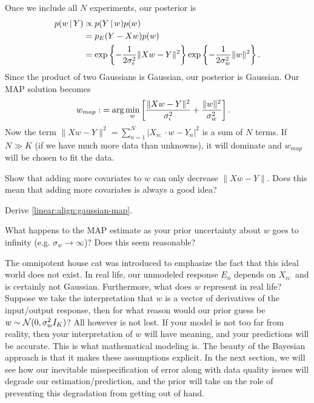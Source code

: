 Once we include all $N$ experiments, our posterior is
\begin{align*}
  p(w{\,|\,} Y) &\propto p(Y{\,|\,} w)p(w) \\
  & = p_E(Y-Xw)p(w) \\ 
  & = \exp\left\{ -\frac{1}{2\sigma_{\epsilon}^2}\|Xw-Y\|^2 \right\}\exp\left\{-\frac{1}{2\sigma_w^2}\|w\|^2\right\}.
\end{align*}
Since the product of two Gaussians is Gaussian, our posterior is Gaussian.  Our MAP solution becomes
\begin{align}
  w_{map} :&= \arg\min_w \left[  \frac{\|Xw-Y\|^2}{\sigma_{\epsilon}^2} + \frac{\|w\|^2}{\sigma_w^2}\right].
  \label{linear:align:gaussian-map}
\end{align}
Now the term $\|Xw-Y\|^2 = \sum_{n=1}^N|X_{n:}\cdot w - Y_n|^2$ is a sum of $N$ terms.  If $N\gg K$ (if we have much more data than unknowns), it will dominate and $w_{map}$ will be chosen to fit the data.

\begin{exercise}
  \label{linear:exercise:overfitting-simple}
  Show that adding more covariates to $w$ can only decrease $\|X w-Y\|$.  Does this mean that adding more covariates is always a good idea?
\end{exercise}

\begin{exercise}
  Derive \eqref{linear:align:gaussian-map}.
\end{exercise}

\begin{exercise}
  What happens to the MAP estimate as your prior uncertainty about $w$ goes to infinity (e.g. $\sigma_w\to\infty$)?  Does this seem reasonable?
\end{exercise}


The omnipotent house cat was introduced to emphasize the fact that this ideal world does not exist.  In real life, our unmodeled response $E_n$ depends on $X_{n:}$ and is certainly not Gaussian.  Furthermore, what does $w$ represent in real life?  Suppose we take the interpretation that $w$ is a vector of derivatives of the input/output response, then for what reason would our prior guess be $w\sim{\mathcal N}(0, \sigma^2_wI_K)$?  All however is not lost.  If your model is not too far from reality, then your interpretation of $w$ will have meaning, and your predictions will be accurate.  This is what mathematical modeling is.  The beauty of the Bayesian approach is that it makes these assumptions explicit.  In the next section, we will see how our inevitable misspecification of error along with data quality issues will degrade our estimation/prediction, and the prior will take on the role of preventing this degradation from getting out of hand.

